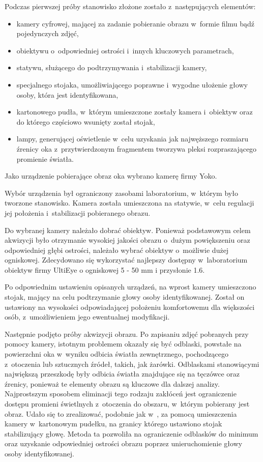 Podczas pierwszej próby stanowisko złożone zostało z~następujących elementów:
\begin{itemize}
 \item kamery cyfrowej, mającej za zadanie pobieranie obrazu w~formie filmu bądź pojedynczych zdjęć,
 \item obiektywu o~odpowiedniej ostrości i~innych kluczowych parametrach,
 \item statywu, służącego do podtrzymywania i~stabilizacji kamery,
 \item specjalnego stojaka, umożliwiającego poprawne i~wygodne ułożenie głowy osoby, która jest identyfikowana,
 \item kartonowego pudła, w~którym umieszczone zostały kamera i~obiektyw oraz do którego częściowo wsunięty został stojak,
 \item lampy, generującej oświetlenie w~celu uzyskania jak najwęższego rozmiaru źrenicy oka z~przytwierdzonym fragmentem tworzywa pleksi rozpraszającego promienie światła.
 \end{itemize}

Jako urządzenie pobierające obraz oka wybrano kamerę firmy Yoko.

Wybór urządzenia był ograniczony zasobami laboratorium, w~którym było tworzone stanowisko. Kamera została umieszczona na statywie, w~celu regulacji jej położenia i~stabilizacji pobieranego obrazu.

Do wybranej kamery należało dobrać obiektyw. Ponieważ podstawowym celem akwizycji było otrzymanie wysokiej jakości obrazu o~dużym powiększeniu oraz odpowiedniej głębi ostrości, należało wybrać obiektyw o~możliwie dużej ogniskowej. Zdecydowano się wykorzystać najlepszy dostępny w~laboratorium obiektyw firmy UltiEye o ogniskowej 5 - 50 mm i przysłonie 1.6.

Po odpowiednim ustawieniu opisanych urządzeń, na wprost kamery umieszczono stojak, mający na celu podtrzymanie głowy osoby identyfikowanej. Został on ustawiony na wysokości odpowiadającej położeniu komfortowemu dla większości osób, z~umożliwieniem jego ewentualnej modyfikacji.

Następnie podjęto próby akwizycji obrazu. Po zapisaniu zdjęć pobranych przy pomocy kamery, istotnym problemem okazały się być odblaski, powstałe na powierzchni oka w~wyniku odbicia światła zewnętrznego, pochodzącego z~otoczenia lub sztucznych źródeł, takich, jak żarówki. Odblaskami stanowiącymi największą przeszkodę były odbicia światła znajdujące się na tęczówce oraz źrenicy, ponieważ te elementy obrazu są kluczowe dla dalszej analizy. Najprostszym sposobem eliminacji tego rodzaju zakłóceń jest ograniczenie dostępu promieni świetlnych z~otoczenia do obszaru, w~którym pobierany jest obraz. Udało się to zrealizować, podobnie jak w~\cite{Gl11}, za pomocą umieszczenia kamery w~kartonowym pudełku, na granicy którego ustawiono stojak stabilizujący głowę. Metoda ta pozwoliła na ograniczenie odblasków do minimum oraz uzyskanie odpowiedniej ostrości obrazu poprzez unieruchomienie głowy osoby identyfikowanej.

